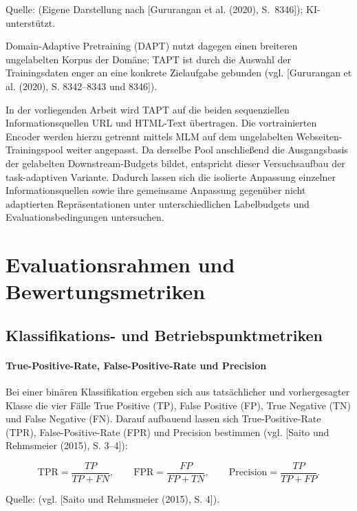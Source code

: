 \begin{center}
    \footnotesize{Quelle: (Eigene Darstellung nach [Gururangan et al. (2020), S.~8346]); KI-unterstützt.}
\end{center}

Domain-Adaptive Pretraining (DAPT) nutzt dagegen einen breiteren ungelabelten Korpus der Domäne; TAPT ist durch die Auswahl der Trainingsdaten enger an eine konkrete Zielaufgabe gebunden (vgl. [Gururangan et al. (2020), S. 8342--8343 und 8346]).

In der vorliegenden Arbeit wird TAPT auf die beiden sequenziellen Informationsquellen URL und
HTML-Text übertragen. Die vortrainierten Encoder werden hierzu getrennt mittels MLM auf dem
ungelabelten Webseiten-Trainingspool weiter angepasst. Da derselbe Pool anschließend die
Ausgangsbasis der gelabelten Downstream-Budgets bildet, entspricht dieser Versuchsaufbau der
task-adaptiven Variante. Dadurch lassen sich die isolierte Anpassung einzelner
Informationsquellen sowie ihre gemeinsame Anpassung gegenüber nicht adaptierten
Repräsentationen unter unterschiedlichen Labelbudgets und Evaluationsbedingungen untersuchen.
\section{Evaluationsrahmen und Bewertungsmetriken}
\label{sec:evaluation_metrics}

\subsection{Klassifikations- und Betriebspunktmetriken}

\paragraph{True-Positive-Rate, False-Positive-Rate und Precision}
Bei einer binären Klassifikation ergeben sich aus tatsächlicher und vorhergesagter Klasse
die vier Fälle True Positive (TP), False Positive (FP), True Negative (TN) und False
Negative (FN). Darauf aufbauend lassen sich True-Positive-Rate (TPR),
False-Positive-Rate (FPR) und Precision bestimmen
(vgl. [Saito und Rehmsmeier (2015), S. 3--4]):

\[
\mathrm{TPR}=\frac{TP}{TP+FN},
\qquad
\mathrm{FPR}=\frac{FP}{FP+TN},
\qquad
\mathrm{Precision}=\frac{TP}{TP+FP}.
\]

\begin{center}
\footnotesize Quelle: (vgl. [Saito und Rehmsmeier (2015), S. 4]).
\end{center}

